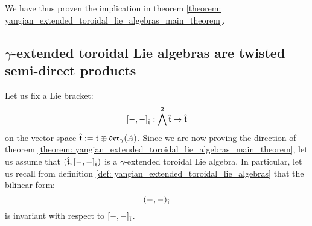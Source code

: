         We have thus proven the  implication in theorem \ref{theorem: yangian_extended_toroidal_lie_algebras_main_theorem}.

    \subsection{\texorpdfstring{$\gamma$}{}-extended toroidal Lie algebras are twisted semi-direct products} \label{subsection: yangian_extended_toroidal_lie_algebras_are_twisted_semi_direct_products}

        Let us fix a Lie bracket:
            $$[-, -]_{\hat{\mathfrak{t}}}: \bigwedge^2 \hat{\mathfrak{t}} \to \hat{\mathfrak{t}}$$
        on the vector space $\hat{\mathfrak{t}} := \mathfrak{t} \oplus \mathfrak{der}_{\gamma}(A)$. Since we are now proving the  direction of theorem \ref{theorem: yangian_extended_toroidal_lie_algebras_main_theorem}, let us assume that $(\hat{\mathfrak{t}}, [-, -]_{\hat{\mathfrak{t}}})$ is a $\gamma$-extended toroidal Lie algebra. In particular, let us recall from definition \ref{def: yangian_extended_toroidal_lie_algebras} that the bilinear form:
            $$(-, -)_{\hat{\mathfrak{t}}}$$
        is invariant with respect to $[-, -]_{\hat{\mathfrak{t}}}$.

